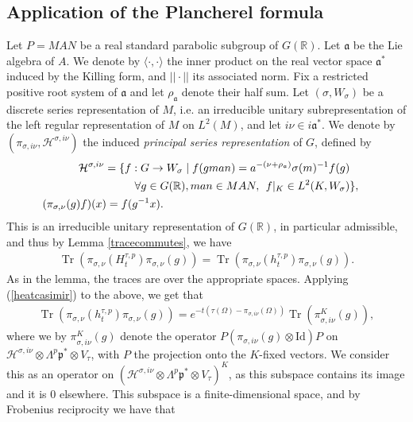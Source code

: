 \documentclass[11pt,reqno]{amsart}
\numberwithin{equation}{section}
\theoremstyle{definition}
\theoremstyle{remark}
\newcommand{\Tr}{\operatorname{Tr}}
\newcommand{\mf}[1]{\mathfrak{#1}}
\newcommand{\R}{\mathbb{R}}
\begin{document}
\subsection*{Application of the Plancherel formula}

Let $P=MAN$ be a real standard parabolic subgroup of $G(\R)$. Let $\mf{a}$ be the Lie algebra of $A$. We denote by $\langle\cdot,\cdot\rangle$ the inner product on the real vector space $\mf{a}^*$ induced by the Killing form, and $||\cdot||$ its associated norm. Fix a restricted positive root system of $\mf{a}$ and let $\rho_{\mf{a}}$ denote their half sum. Let $(\sigma,W_\sigma)$ be a discrete series representation of $M$, i.e. an irreducible unitary subrepresentation of the left regular representation of $M$ on $L^2(M)$, and let $i\nu\in i\mf{a}^*$. We denote by $(\pi_{\sigma,i\nu},\mathcal{H}^{\sigma,i\nu})$ the induced \emph{principal series representation} of $G$, defined by
\begin{align*}
    \mathcal{H}^{\sigma,i\nu}=\lbrace f:G\to W_\sigma \mid f(gman) = a^{-(\nu+\rho_{\mf{a}})}\sigma(m)^{-1}f(g) \\
    \:\forall g\in G(\R), man\in MAN,\:\: f|_{K}\in L^2(K,W_\sigma)&\rbrace, \\
    (\pi_{\sigma,\nu}(g)f)(x) = f(g^{-1} x).\hspace{16.8em}
\end{align*}
This is an irreducible unitary representation of $G(\R)$, in particular admissible, and thus by Lemma \ref{tracecommutes}, we have
\begin{align}\label{traceheat}
    \Tr(\pi_{\sigma,\nu}(H_t^{\tau,p})\pi_{\sigma,\nu}(g)) = \Tr(\pi_{\sigma,\nu}(h_t^{\tau,p})\pi_{\sigma,\nu}(g)).
\end{align}
As in the lemma, the traces are over the appropriate spaces. Applying (\ref{heatcasimir}) to the above, we get that 
\begin{align}\label{planchereltrace}
    \Tr(\pi_{\sigma,\nu}(h_t^{\tau,p})\pi_{\sigma,\nu}(g)) = e^{-t(\tau(\Omega)-\pi_{\sigma,i\nu}(\Omega))} \Tr(\pi_{\sigma,i\nu}^K(g)),
\end{align}
where we by $\pi_{\sigma,i\nu}^K(g)$ denote the operator $P(\pi_{\sigma,i\nu}(g)\otimes \text{Id})P$ on $\mathcal{H}^{\sigma,i\nu}\otimes \Lambda^p\mf{p}^*\otimes V_\tau$, with $P$ the projection onto the $K$-fixed vectors. We consider this as an operator on $(\mathcal{H}^{\sigma,i\nu}\otimes \Lambda^p\mf{p}^*\otimes V_\tau)^K$, as this subspace contains its image and it is $0$ elsewhere. This subspace is a finite-dimensional space, and by Frobenius reciprocity we have that
\end{document}
